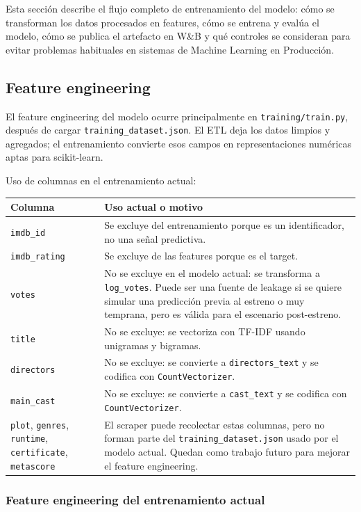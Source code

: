 \documentclass[letterpaper,12pt]{article}
\begin{document}
Esta sección describe el flujo completo de entrenamiento del modelo: cómo se transforman los datos procesados en features, cómo se entrena y evalúa el modelo, cómo se publica el artefacto en W\&B y qué controles se consideran para evitar problemas habituales en sistemas de Machine Learning en Producción.

\subsection{Feature engineering}

El feature engineering del modelo ocurre principalmente en \texttt{training/train.py}, después de cargar \texttt{training\_dataset.json}. El ETL deja los datos limpios y agregados; el entrenamiento convierte esos campos en representaciones numéricas aptas para scikit-learn.

Uso de columnas en el entrenamiento actual:

\begin{longtable}{p{4cm}p{12cm}}
\toprule
\textbf{Columna} & \textbf{Uso actual o motivo} \\
\midrule
\texttt{imdb\_id} & Se excluye del entrenamiento porque es un identificador, no una señal predictiva. \\
\texttt{imdb\_rating} & Se excluye de las features porque es el target. \\
\texttt{votes} & No se excluye en el modelo actual: se transforma a \texttt{log\_votes}. Puede ser una fuente de leakage si se quiere simular una predicción previa al estreno o muy temprana, pero es válida para el escenario post-estreno. \\
\texttt{title} & No se excluye: se vectoriza con TF-IDF usando unigramas y bigramas. \\
\texttt{directors} & No se excluye: se convierte a \texttt{directors\_text} y se codifica con \texttt{CountVectorizer}. \\
\texttt{main\_cast} & No se excluye: se convierte a \texttt{cast\_text} y se codifica con \texttt{CountVectorizer}. \\
\texttt{plot}, \texttt{genres}, \texttt{runtime}, \texttt{certificate}, \texttt{metascore} & El scraper puede recolectar estas columnas, pero no forman parte del \texttt{training\_dataset.json} usado por el modelo actual. Quedan como trabajo futuro para mejorar el feature engineering. \\
\bottomrule
\end{longtable}

\subsubsection{Feature engineering del entrenamiento actual}
\end{document}
